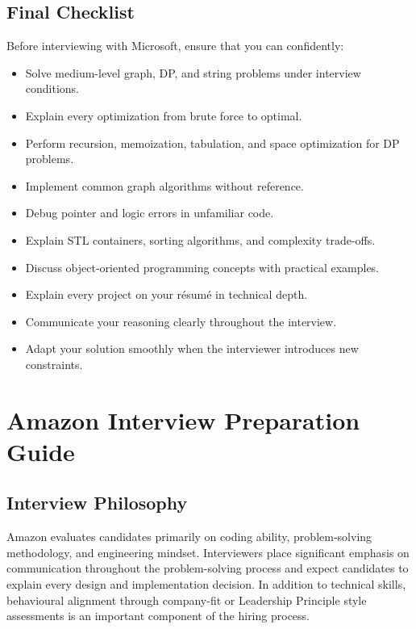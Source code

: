 \documentclass[11pt,a4paper]{article}
\begin{document}

\subsection{Final Checklist}

Before interviewing with Microsoft, ensure that you can confidently:

\begin{itemize}
	\item Solve medium-level graph, DP, and string problems under interview conditions.
	\item Explain every optimization from brute force to optimal.
	\item Perform recursion, memoization, tabulation, and space optimization for DP problems.
	\item Implement common graph algorithms without reference.
	\item Debug pointer and logic errors in unfamiliar code.
	\item Explain STL containers, sorting algorithms, and complexity trade-offs.
	\item Discuss object-oriented programming concepts with practical examples.
	\item Explain every project on your résumé in technical depth.
	\item Communicate your reasoning clearly throughout the interview.
	\item Adapt your solution smoothly when the interviewer introduces new constraints.
\end{itemize}

\section{Amazon Interview Preparation Guide}

\subsection{Interview Philosophy}

Amazon evaluates candidates primarily on coding ability, problem-solving methodology, and engineering mindset. Interviewers place significant emphasis on communication throughout the problem-solving process and expect candidates to explain every design and implementation decision. In addition to technical skills, behavioural alignment through company-fit or Leadership Principle style assessments is an important component of the hiring process.
\end{document}
